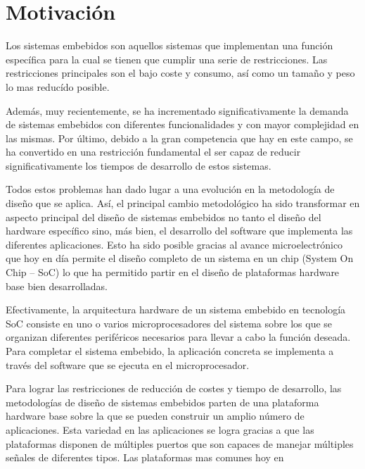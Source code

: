\section{Motivación} 
\par
Los sistemas embebidos son aquellos sistemas que implementan una función específica para la cual se tienen que cumplir una serie de restricciones.
Las restricciones principales son el bajo coste y consumo, así como un tamaño y peso lo mas reducído posible.
\vspace{0.5cm}
\par 
Además, muy recientemente, se ha incrementado  significativamente la demanda de sistemas embebidos con diferentes funcionalidades y con mayor
complejidad  en las mismas. Por último, debido a la gran competencia  que hay en este campo, se ha convertido en una restricción fundamental el ser
capaz de reducir significativamente los tiempos de desarrollo de estos sistemas.
\vspace{0.5cm}
\par 
Todos estos problemas han dado lugar a una evolución en la metodología de diseño que se aplica. Así, el principal cambio metodológico ha sido
transformar en aspecto principal del diseño de sistemas embebidos no tanto el diseño del hardware específico sino, más bien, el desarrollo del
software que implementa las diferentes aplicaciones. Esto ha sido posible gracias al avance microelectrónico que hoy en día permite el diseño
completo de un sistema en un chip (System On Chip – SoC) lo que ha permitido partir en el diseño de plataformas hardware base bien desarrolladas.
\vspace{0.5cm}
\par 
Efectivamente, la arquitectura hardware de un sistema embebido en tecnología SoC consiste en uno o varios microprocesadores del sistema sobre los que
se organizan diferentes periféricos necesarios para llevar a cabo la función deseada. Para completar el sistema embebido, la aplicación concreta se
implementa a través del software que se ejecuta en el microprocesador.
\vspace{0.5cm}
\par 
Para lograr las restricciones de reducción de costes y tiempo de desarrollo, las metodologías de diseño de sistemas embebidos parten de una
plataforma hardware base sobre la que se pueden construir un amplio número de aplicaciones. Esta variedad en las aplicaciones se logra gracias a que
las plataformas disponen de múltiples puertos que son capaces de manejar múltiples señales de diferentes tipos. Las plataformas mas comunes hoy en
